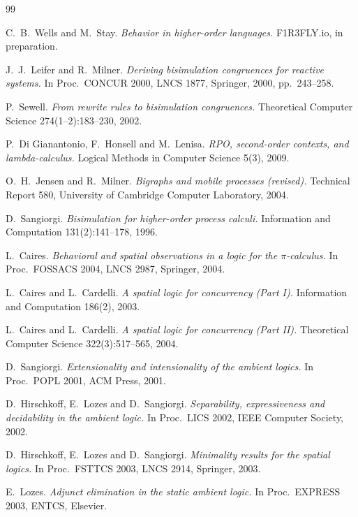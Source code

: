 \documentclass[11pt]{article}
\theoremstyle{plain}
\theoremstyle{definition}
\begin{document}
\begin{thebibliography}{99}

 C.\ B.\ Wells and M.\ Stay. \emph{Behavior in higher-order languages.} F1R3FLY.io, in
preparation.

 J.\ J.\ Leifer and R.\ Milner. \emph{Deriving bisimulation congruences for
reactive systems.} In Proc.\ CONCUR 2000, LNCS 1877, Springer, 2000, pp.\ 243--258.

 P.\ Sewell. \emph{From rewrite rules to bisimulation congruences.} Theoretical
Computer Science 274(1--2):183--230, 2002.

 P.\ Di Gianantonio, F.\ Honsell and M.\ Lenisa. \emph{RPO, second-order contexts,
and lambda-calculus.} Logical Methods in Computer Science 5(3), 2009.

 O.\ H.\ Jensen and R.\ Milner. \emph{Bigraphs and mobile processes (revised).}
Technical Report 580, University of Cambridge Computer Laboratory, 2004.

 D.\ Sangiorgi. \emph{Bisimulation for higher-order process calculi.} Information
and Computation 131(2):141--178, 1996.

 L.\ Caires. \emph{Behavioral and spatial observations in a logic for the
$\pi$-calculus.} In Proc.\ FOSSACS 2004, LNCS 2987, Springer, 2004.

 L.\ Caires and L.\ Cardelli. \emph{A spatial logic for concurrency (Part I).}
Information and Computation 186(2), 2003.

 L.\ Caires and L.\ Cardelli. \emph{A spatial logic for concurrency
(Part II).} Theoretical Computer Science 322(3):517--565, 2004.

 D.\ Sangiorgi. \emph{Extensionality and intensionality of the ambient
logics.} In Proc.\ POPL 2001, ACM Press, 2001.

 D.\ Hirschkoff, E.\ Lozes and D.\ Sangiorgi. \emph{Separability, expressiveness and
decidability in the ambient logic.} In Proc.\ LICS 2002, IEEE Computer Society, 2002.

 D.\ Hirschkoff, E.\ Lozes and D.\ Sangiorgi. \emph{Minimality results for the spatial
logics.} In Proc.\ FSTTCS 2003, LNCS 2914, Springer, 2003.

 E.\ Lozes. \emph{Adjunct elimination in the static ambient logic.} In Proc.\
EXPRESS 2003, ENTCS, Elsevier.


\end{thebibliography}
\end{document}
